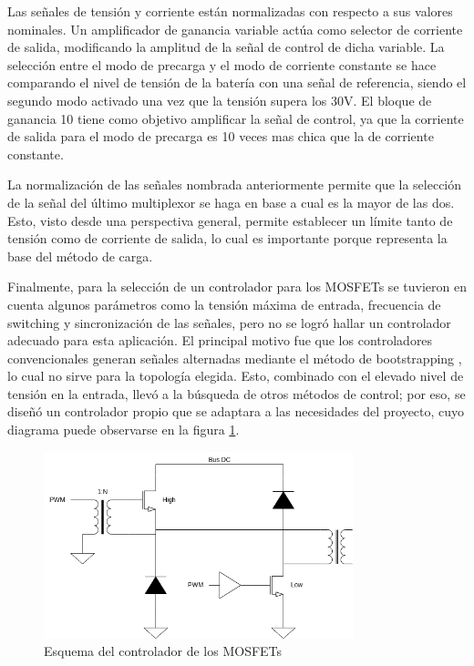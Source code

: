 Las señales de tensión y corriente están normalizadas con respecto a sus valores nominales.
Un amplificador de ganancia variable actúa como selector de corriente de salida,
modificando la amplitud de la señal de control de dicha variable.
La selección entre el modo de precarga y el modo de corriente constante se hace comparando el nivel de tensión de la batería
con una señal de referencia, siendo el segundo modo activado una vez que la tensión supera los 30V.
El bloque de ganancia 10 tiene como objetivo amplificar la señal de control, ya que la corriente de salida para el modo
de precarga es 10 veces mas chica que la de corriente constante.

La normalización de las señales nombrada anteriormente permite que la selección de la señal del último multiplexor
se haga en base a cual es la mayor de las dos. Esto, visto desde una perspectiva general, permite establecer un límite
tanto de tensión como de corriente de salida, lo cual es importante porque representa la base del método de carga.

Finalmente, para la selección de un controlador para los MOSFETs se tuvieron en cuenta algunos parámetros como
la tensión máxima de entrada, frecuencia de switching y sincronización de las señales,
pero no se logró hallar un controlador adecuado para esta aplicación.
El principal motivo fue que los controladores convencionales generan señales alternadas mediante el método de bootstrapping \cite{hart},
lo cual no sirve para la topología elegida. Esto, combinado con el elevado nivel de tensión en la entrada,
llevó a la búsqueda de otros métodos de control; por eso, se diseñó un controlador propio que se adaptara
a las necesidades del proyecto, cuyo diagrama puede observarse en la figura \ref{fig:driver}.

\begin{figure}
    \centering
    \includegraphics[width=0.8\textwidth]{images/driver.png}
    \caption{Esquema del controlador de los MOSFETs}
    \label{fig:driver}
\end{figure}

